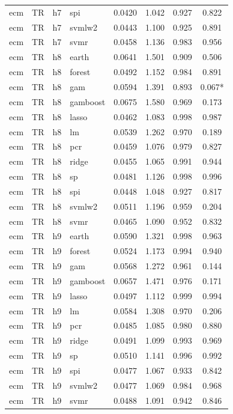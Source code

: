 \begin{ThreePartTable}
\begin{longtable}[t]{llclcccc}
ecm & TR & h7 & spi & 0.0420 & 1.042 & 0.927 & 0.822\\
ecm & TR & h7 & svmlw2 & 0.0443 & 1.100 & 0.925 & 0.891\\
ecm & TR & h7 & svmr & 0.0458 & 1.136 & 0.983 & 0.956\\
\addlinespace
ecm & TR & h8 & earth & 0.0641 & 1.501 & 0.909 & 0.506\\
ecm & TR & h8 & forest & 0.0492 & 1.152 & 0.984 & 0.891\\
ecm & TR & h8 & gam & 0.0594 & 1.391 & 0.893 & 0.067*\\
ecm & TR & h8 & gamboost & 0.0675 & 1.580 & 0.969 & 0.173\\
ecm & TR & h8 & lasso & 0.0462 & 1.083 & 0.998 & 0.987\\
ecm & TR & h8 & lm & 0.0539 & 1.262 & 0.970 & 0.189\\
ecm & TR & h8 & pcr & 0.0459 & 1.076 & 0.979 & 0.827\\
ecm & TR & h8 & ridge & 0.0455 & 1.065 & 0.991 & 0.944\\
ecm & TR & h8 & sp & 0.0481 & 1.126 & 0.998 & 0.996\\
ecm & TR & h8 & spi & 0.0448 & 1.048 & 0.927 & 0.817\\
ecm & TR & h8 & svmlw2 & 0.0511 & 1.196 & 0.959 & 0.204\\
ecm & TR & h8 & svmr & 0.0465 & 1.090 & 0.952 & 0.832\\
\addlinespace
ecm & TR & h9 & earth & 0.0590 & 1.321 & 0.998 & 0.963\\
ecm & TR & h9 & forest & 0.0524 & 1.173 & 0.994 & 0.940\\
ecm & TR & h9 & gam & 0.0568 & 1.272 & 0.961 & 0.144\\
ecm & TR & h9 & gamboost & 0.0657 & 1.471 & 0.976 & 0.171\\
ecm & TR & h9 & lasso & 0.0497 & 1.112 & 0.999 & 0.994\\
ecm & TR & h9 & lm & 0.0584 & 1.308 & 0.970 & 0.206\\
ecm & TR & h9 & pcr & 0.0485 & 1.085 & 0.980 & 0.880\\
ecm & TR & h9 & ridge & 0.0491 & 1.099 & 0.993 & 0.969\\
ecm & TR & h9 & sp & 0.0510 & 1.141 & 0.996 & 0.992\\
ecm & TR & h9 & spi & 0.0477 & 1.067 & 0.933 & 0.842\\
ecm & TR & h9 & svmlw2 & 0.0477 & 1.069 & 0.984 & 0.968\\
ecm & TR & h9 & svmr & 0.0488 & 1.091 & 0.942 & 0.846\\

\end{longtable}
\end{ThreePartTable}
